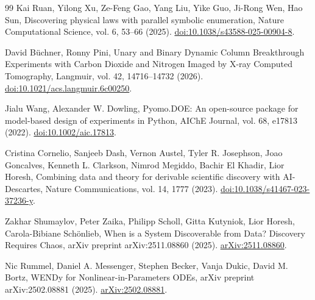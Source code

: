 \documentclass[11pt]{article}
\begin{document}
\begin{thebibliography}{99}
 Kai Ruan, Yilong Xu, Ze-Feng Gao, Yang Liu, Yike Guo, Ji-Rong Wen, Hao Sun, Discovering physical laws with parallel symbolic enumeration, Nature Computational Science, vol. 6, 53--66 (2025). \href{https://doi.org/10.1038/s43588-025-00904-8}{doi:10.1038/s43588-025-00904-8}.

 David B\"{u}chner, Ronny Pini, Unary and Binary Dynamic Column Breakthrough Experiments with Carbon Dioxide and Nitrogen Imaged by X-ray Computed Tomography, Langmuir, vol. 42, 14716--14732 (2026). \href{https://doi.org/10.1021/acs.langmuir.6c00250}{doi:10.1021/acs.langmuir.6c00250}.

 Jialu Wang, Alexander W. Dowling, Pyomo.DOE: An open-source package for model-based design of experiments in Python, AIChE Journal, vol. 68, e17813 (2022). \href{https://doi.org/10.1002/aic.17813}{doi:10.1002/aic.17813}.

 Cristina Cornelio, Sanjeeb Dash, Vernon Austel, Tyler R. Josephson, Joao Goncalves, Kenneth L. Clarkson, Nimrod Megiddo, Bachir El Khadir, Lior Horesh, Combining data and theory for derivable scientific discovery with AI-Descartes, Nature Communications, vol. 14, 1777 (2023). \href{https://doi.org/10.1038/s41467-023-37236-y}{doi:10.1038/s41467-023-37236-y}.

 Zakhar Shumaylov, Peter Zaika, Philipp Scholl, Gitta Kutyniok, Lior Horesh, Carola-Bibiane Sch\"{o}nlieb, When is a System Discoverable from Data? Discovery Requires Chaos, arXiv preprint arXiv:2511.08860 (2025). \href{https://arxiv.org/abs/2511.08860}{arXiv:2511.08860}.

 Nic Rummel, Daniel A. Messenger, Stephen Becker, Vanja Dukic, David M. Bortz, WENDy for Nonlinear-in-Parameters ODEs, arXiv preprint arXiv:2502.08881 (2025). \href{https://arxiv.org/abs/2502.08881}{arXiv:2502.08881}.
\end{thebibliography}
\end{document}
